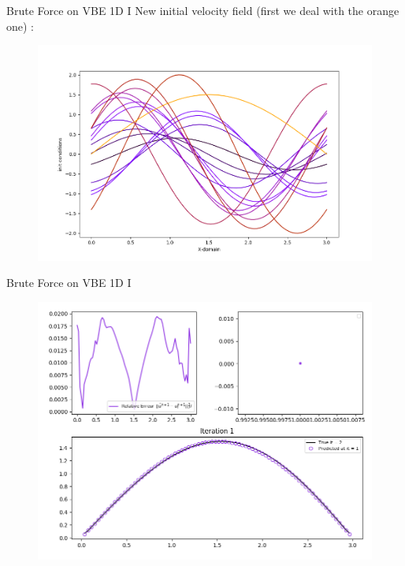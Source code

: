 \documentclass[10pt,
			   xcolor=svgnames,
			   hyperref={linkcolor=red, citecolor = DarkGreen, colorlinks=true, urlcolor=Navy}]{beamer}
\newcommand\bk{\color{black}}
\begin{document}
\begin{frame}{Brute Force on VBE 1D I}
	New initial velocity field (first we deal with the \color{orange} orange \bk one) : 
	\begin{figure}[H]
	\centering
	\includegraphics[scale=0.4]{Initialisation_cases_Andu1.png}
	\end{figure}
\end{frame}

\begin{frame}{Brute Force on VBE 1D I}
	\begin{figure}[H]
	\centering
	\includegraphics[scale=0.4]{Pres_First_Iteration_1.png}
	\end{figure} 
\end{frame}
\end{document}
